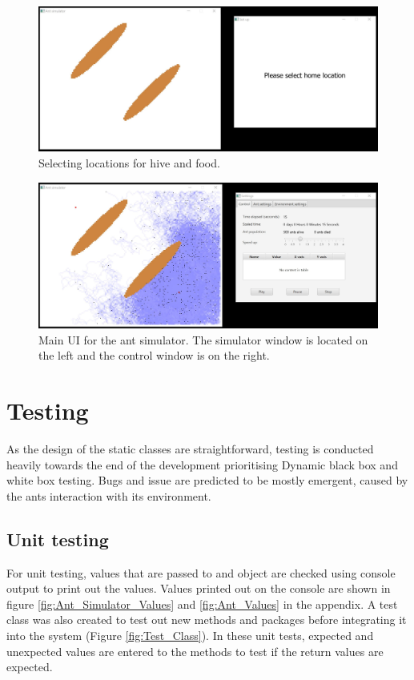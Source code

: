 \documentclass[a4paper, oneside, 11pt]{report}
\begin{document}
\begin{figure}[htb]
	\begin{center}
		\includegraphics[width=1.0 \columnwidth]{Location_Selection.jpg}
		\caption{Selecting locations for hive and food.}
		\label{fig:Location_Selection}
	\end{center}
\end{figure}

\begin{figure}[htb]
	\begin{center}
		\includegraphics[width=1.0 \columnwidth]{Main_Simulator.jpg}
		\caption{Main UI for the ant simulator. The simulator window is located on the left and the control window is on the right.}
		\label{fig:Main_Simulator}
	\end{center}
\end{figure}


\chapter{Testing}
\label{chap:Testing}
As the design of the static classes are straightforward, testing is conducted heavily towards the end of the development prioritising Dynamic black box and white box testing. Bugs and issue are predicted to be mostly emergent, caused by the ants interaction with its environment.

\section{Unit testing}
For unit testing, values that are passed to and object are checked using console output to print out the values. Values printed out on the console are shown in figure \ref{fig:Ant_Simulator_Values} and \ref{fig:Ant_Values} in the appendix. A test class was also created to test out  new methods and packages before integrating it into the system (Figure \ref{fig:Test_Class}). In these unit tests, expected and unexpected values are entered to the methods to test if the return values are expected.
\end{document}
